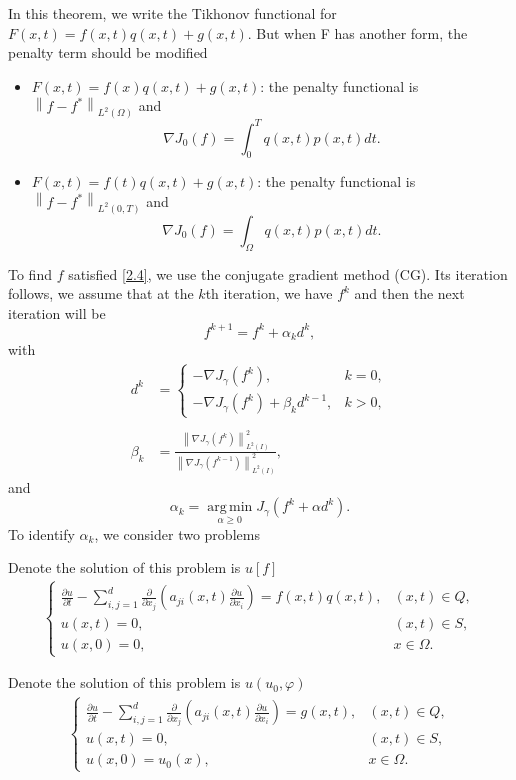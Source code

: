 \documentclass[]{article}
\begin{document}
\begin{cy}
	In this theorem, we write the Tikhonov functional for $F(x, t)=f(x, t)q(x, t)+g(x, t)$. But when F has another form, the penalty term should be modified
	\begin{itemize}
		\item $F(x, t)=f(x)q(x, t)+g(x, t)$: the penalty functional is $\left\|f-f^*\right\|_{L^2(\Omega)}$ and $$\nabla J_0(f)=\int_0^Tq(x, t)p(x, t)dt.$$
		\item $F(x, t)=f(t)q(x, t)+g(x, t)$: the penalty functional is $\left\|f-f^*\right\|_{L^2(0, T)}$ and $$\nabla J_0(f)=\int_\Omega q(x, t)p(x, t)dt.$$
	\end{itemize}
\end{cy}
\noindent To find $f$ satisfied \eqref{2.4}, we use the conjugate gradient method (CG). Its iteration follows, we assume that at the $k$th iteration, we have $f^k$ and then the next iteration will be
$$f^{k+1}=f^k+\alpha_kd^k,$$
with
\begin{align*}
	d^k&=\left\{\begin{array}{ll}
	-\nabla J_\gamma(f^k),& k=0,\\
	-\nabla J_\gamma(f^k)+\beta_kd^{k-1},& k>0,
	\end{array}\right.\\\\
	\beta_k&=\frac{\left\|\nabla J_\gamma (f^k)\right\|^2_{L^2(I)}}{\left\|\nabla J_\gamma (f^{k-1})\right\|^2_{L^2(I)}},
\end{align*}
and
$$\alpha_k=\operatorname*{arg\,min}_{\alpha\geq 0}J_\gamma(f^k+\alpha d^k).$$
To identify $\alpha_k$, we consider two problems
\begin{bt}\label{bt2.1}
	Denote the solution of this problem is $u[f]$
	\begin{align*}
		\begin{cases}
			\frac{\partial u}{\partial t}-\sum_{i, j=1}^{d}\frac{\partial}{\partial x_j}\left(a_{ji}(x, t)\frac{\partial u}{\partial x_i}\right)=f(x, t)q(x, t),&(x, t)\in Q,\\
			u(x, t)=0, & (x, t)\in S,\\
			u(x, 0)=0,&x\in \Omega.
		\end{cases}
	\end{align*}
\end{bt}
\begin{bt}\label{bt2.2}
	Denote the solution of this problem is $u(u_0, \varphi)$
	\begin{align*}
		\begin{cases}
			\frac{\partial u}{\partial t}-\sum_{i, j=1}^{d}\frac{\partial}{\partial x_j}\left(a_{ji}(x, t)\frac{\partial u}{\partial x_i}\right)=g(x, t),&(x, t)\in Q,\\
			u(x, t)=0, & (x, t)\in S,\\
			u(x, 0)=u_0(x),&x\in \Omega.
		\end{cases}
	\end{align*}
\end{bt}
\end{document}
